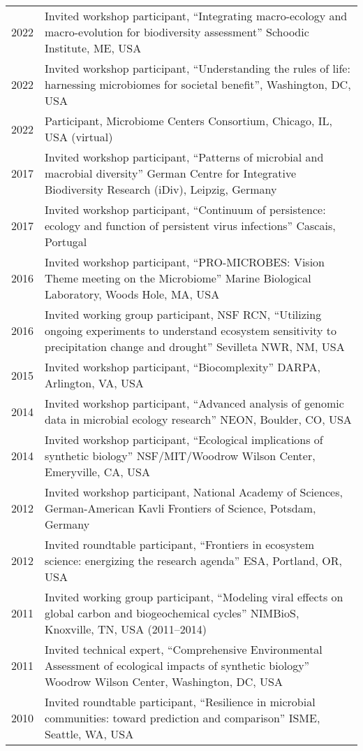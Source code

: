 \documentclass[11pt]{article}
\begin{document}
\begin{longtable}{@{}p{2cm}@{\hspace{1em}}p{14cm}@{}}
2022 & Invited workshop participant, “Integrating macro-ecology and macro-evolution for biodiversity assessment” Schoodic Institute, ME, USA \\
2022 & Invited workshop participant, “Understanding the rules of life: harnessing microbiomes for societal benefit”, Washington, DC, USA \\
2022 & Participant, Microbiome Centers Consortium, Chicago, IL, USA (virtual) \\
2017 & Invited workshop participant, “Patterns of microbial and macrobial diversity” German Centre for Integrative Biodiversity Research (iDiv), Leipzig, Germany \\
2017 & Invited workshop participant, “Continuum of persistence: ecology and function of persistent virus infections” Cascais, Portugal \\
2016 & Invited workshop participant, “PRO-MICROBES: Vision Theme meeting on the Microbiome” Marine Biological Laboratory, Woods Hole, MA, USA \\
2016 & Invited working group participant, NSF RCN, “Utilizing ongoing experiments to understand ecosystem sensitivity to precipitation change and drought” Sevilleta NWR, NM, USA \\
2015 & Invited workshop participant, “Biocomplexity” DARPA, Arlington, VA, USA \\
2014 & Invited workshop participant, “Advanced analysis of genomic data in microbial ecology research” NEON, Boulder, CO, USA \\
2014 & Invited workshop participant, “Ecological implications of synthetic biology” NSF/MIT/Woodrow Wilson Center, Emeryville, CA, USA \\
2012 & Invited workshop participant, National Academy of Sciences, German-American Kavli Frontiers of Science, Potsdam, Germany \\
2012 & Invited roundtable participant, “Frontiers in ecosystem science: energizing the research agenda” ESA, Portland, OR, USA \\
2011 & Invited working group participant, “Modeling viral effects on global carbon and biogeochemical cycles” NIMBioS, Knoxville, TN, USA (2011--2014) \\
2011 & Invited technical expert, “Comprehensive Environmental Assessment of ecological impacts of synthetic biology” Woodrow Wilson Center, Washington, DC, USA \\
2010 & Invited roundtable participant, “Resilience in microbial communities: toward prediction and comparison” ISME, Seattle, WA, USA \\

\end{longtable}
\end{document}
